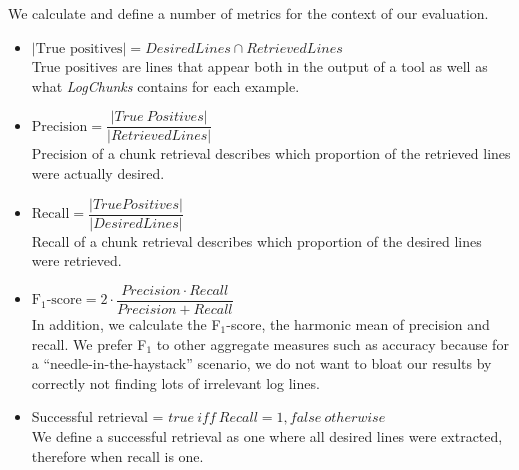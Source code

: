 We calculate and define a number of metrics for the context of our
evaluation.

\vspace{0.2cm}
\begin{itemize}[leftmargin=0.4cm] \itemsep1em
	\item $|\mbox{True positives}| = \mathit{DesiredLines} \cap
	\mathit{RetrievedLines}$ \vspace{0.2cm}\\
        True positives are lines that appear both in the output of a
        tool as well as what \textit{LogChunks} contains for each
        example. 
	\item $\mbox{Precision} = \dfrac{|\mathit{True\
	Positives}|}{|\mathit{RetrievedLines}|}$ \vspace{0.21cm} \\
        Precision of a chunk retrieval describes which proportion of
        the retrieved lines were actually desired. 
	\item $\mbox{Recall} =
	\dfrac{|\mathit{TruePositives}|}{|\mathit{DesiredLines}|}$
	\vspace{0.2cm} \\
        Recall of a chunk retrieval describes which proportion of the
        desired lines were retrieved.
	\item $\mbox{F$_{1}$-score} = 2 \cdot \dfrac{\mathit{Precision}
	\cdot \mathit{Recall}}{\mathit{Precision} + \mathit{Recall}}$
	\vspace{0.2cm}\\
        In addition, we calculate the F$_{1}$-score, the harmonic mean
        of precision and recall. We prefer F$_{1}$ to other aggregate
        measures such as accuracy because for a
        ``needle-in-the-haystack'' scenario, we do not want to bloat
        our results by correctly not finding lots of irrelevant log
        lines.
	\item Successful retrieval = $\mathit{true}\ \mathit{iff}\
	\mathit{Recall} = 1, \mathit{false\ otherwise}$  \vspace{0.2cm} \\
	We define a successful retrieval as one where all desired lines were
	extracted, therefore when recall is one.
\end{itemize}

